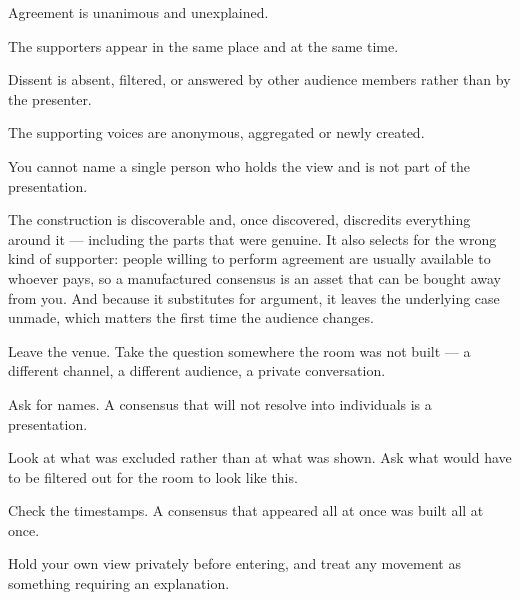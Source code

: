\begin{feedback}
  \item Agreement is unanimous and unexplained.
  \item The supporters appear in the same place and at the same time.
  \item Dissent is absent, filtered, or answered by other audience members rather than by the presenter.
  \item The supporting voices are anonymous, aggregated or newly created.
  \item You cannot name a single person who holds the view and is not part of the presentation.
\end{feedback}

\begin{failure}
The construction is discoverable and, once discovered, discredits everything around it --- including the parts that were genuine. It also selects for the wrong kind of supporter: people willing to perform agreement are usually available to whoever pays, so a manufactured consensus is an asset that can be bought away from you. And because it substitutes for argument, it leaves the underlying case unmade, which matters the first time the audience changes.
\end{failure}

\begin{countermeasures}
  \item Leave the venue. Take the question somewhere the room was not built --- a different channel, a different audience, a private conversation.
  \item Ask for names. A consensus that will not resolve into individuals is a presentation.
  \item Look at what was excluded rather than at what was shown. Ask what would have to be filtered out for the room to look like this.
  \item Check the timestamps. A consensus that appeared all at once was built all at once.
  \item Hold your own view privately before entering, and treat any movement as something requiring an explanation.
\end{countermeasures}

\seesources
{}
